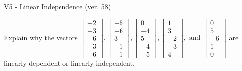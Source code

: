 \begin{exercise}
  \begin{exerciseTitle}V5 - Linear Independence (ver. 58)\end{exerciseTitle}
  \begin{exerciseStatement}
    Explain why the vectors \(\left[\begin{array}{r}
-2 \\
-3 \\
-6 \\
-3 \\
-6
\end{array}\right] , \left[\begin{array}{r}
-5 \\
-6 \\
3 \\
-1 \\
-1
\end{array}\right] , \left[\begin{array}{r}
0 \\
-4 \\
5 \\
-4 \\
-5
\end{array}\right] , \left[\begin{array}{r}
1 \\
3 \\
-2 \\
-3 \\
4
\end{array}\right] , \text{ and } \left[\begin{array}{r}
0 \\
5 \\
-6 \\
1 \\
0
\end{array}\right]\) are linearly dependent or linearly independent.	



\end{exerciseStatement}
\end{exercise}

